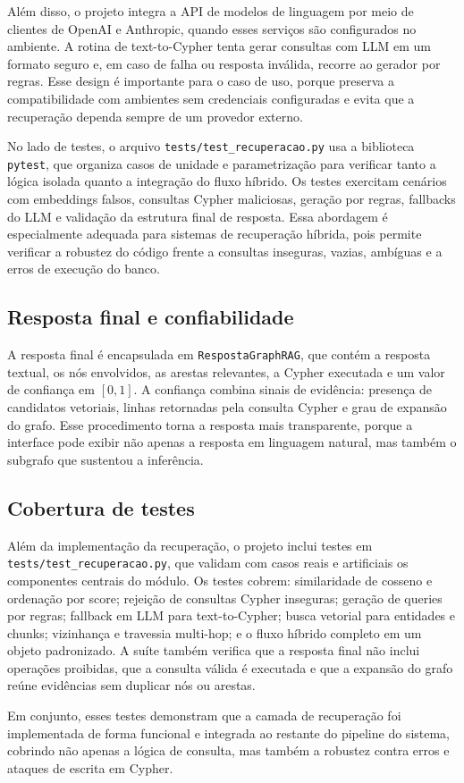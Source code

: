 Além disso, o projeto integra a API de modelos de linguagem por meio de clientes de OpenAI e Anthropic, quando esses serviços são configurados no ambiente. A rotina de text-to-Cypher tenta gerar consultas com LLM em um formato seguro e, em caso de falha ou resposta inválida, recorre ao gerador por regras. Esse design é importante para o caso de uso, porque preserva a compatibilidade com ambientes sem credenciais configuradas e evita que a recuperação dependa sempre de um provedor externo.

No lado de testes, o arquivo \texttt{tests/test\_recuperacao.py} usa a biblioteca \texttt{pytest}, que organiza casos de unidade e parametrização para verificar tanto a lógica isolada quanto a integração do fluxo híbrido. Os testes exercitam cenários com embeddings falsos, consultas Cypher maliciosas, geração por regras, fallbacks do LLM e validação da estrutura final de resposta. Essa abordagem é especialmente adequada para sistemas de recuperação híbrida, pois permite verificar a robustez do código frente a consultas inseguras, vazias, ambíguas e a erros de execução do banco.

\subsection{Resposta final e confiabilidade}

A resposta final é encapsulada em \texttt{RespostaGraphRAG}, que contém a resposta textual, os nós envolvidos, as arestas relevantes, a Cypher executada e um valor de confiança em $[0,1]$. A confiança combina sinais de evidência: presença de candidatos vetoriais, linhas retornadas pela consulta Cypher e grau de expansão do grafo. Esse procedimento torna a resposta mais transparente, porque a interface pode exibir não apenas a resposta em linguagem natural, mas também o subgrafo que sustentou a inferência.

\subsection{Cobertura de testes}

Além da implementação da recuperação, o projeto inclui testes em \texttt{tests/test\_recuperacao.py}, que validam com casos reais e artificiais os componentes centrais do módulo. Os testes cobrem: similaridade de cosseno e ordenação por score; rejeição de consultas Cypher inseguras; geração de queries por regras; fallback em LLM para text-to-Cypher; busca vetorial para entidades e chunks; vizinhança e travessia multi-hop; e o fluxo híbrido completo em um objeto padronizado. A suíte também verifica que a resposta final não inclui operações proibidas, que a consulta válida é executada e que a expansão do grafo reúne evidências sem duplicar nós ou arestas.

Em conjunto, esses testes demonstram que a camada de recuperação foi implementada de forma funcional e integrada ao restante do pipeline do sistema, cobrindo não apenas a lógica de consulta, mas também a robustez contra erros e ataques de escrita em Cypher.